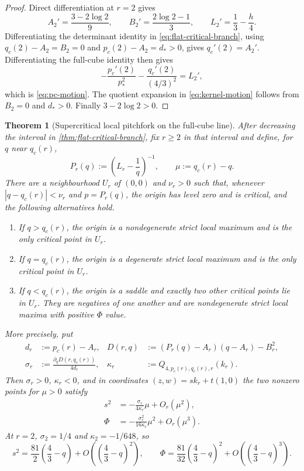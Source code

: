 \documentclass[11pt,reqno]{amsart}
\numberwithin{equation}{section}
\newtheorem{theorem}{Theorem}[section]
\theoremstyle{definition}
\theoremstyle{remark}
\begin{document}
\begin{proof}
Direct differentiation at $r=2$ gives
\[
  A_2'=\frac{3-2\log2}{9},
  \qquad
  B_2'=\frac{2\log2-1}{3},
  \qquad
  L_2'=\frac13-\frac h4.
\]
Differentiating the determinant identity in
\eqref{eq:flat-critical-branch}, using $q_c(2)-A_2=B_2=0$ and
$p_c(2)-A_2=d_*>0$, gives $q_c'(2)=A_2'$.  Differentiating the full-cube
identity then gives
\[
  -\frac{p_c'(2)}{p_*^2}
  -\frac{q_c'(2)}{(4/3)^2}
  =L_2',
\]
which is \eqref{eq:pc-motion}.  The quotient expansion in
\eqref{eq:kernel-motion} follows from $B_2=0$ and $d_*>0$.  Finally
$3-2\log2>0$.
\end{proof}

\begin{theorem}[Supercritical local pitchfork on the full-cube line]
\label{thm:flat-local-pitchfork}
After decreasing the interval in \cref{thm:flat-critical-branch}, fix
$r\ge2$ in that interval and define, for $q$ near $q_c(r)$,
\[
  P_r(q):=\left(L_r-\frac1q\right)^{-1},
  \qquad
  \mu:=q_c(r)-q.
\]
There are a neighbourhood $U_r$ of $(0,0)$ and $\nu_r>0$ such that, whenever
$|q-q_c(r)|<\nu_r$ and $p=P_r(q)$, the origin has level zero and is critical,
and the following alternatives hold.
\begin{enumerate}[label=\textup{(\roman*)}]
  \item If $q>q_c(r)$, the origin is a nondegenerate strict local maximum and
  is the only critical point in $U_r$.
  \item If $q=q_c(r)$, the origin is a degenerate strict local maximum and is
  the only critical point in $U_r$.
  \item If $q<q_c(r)$, the origin is a saddle and exactly two other critical
  points lie in $U_r$.  They are negatives of one another and are
  nondegenerate strict local maxima with positive $\Phi$ value.
\end{enumerate}
More precisely, put
\begin{align*}
  d_r&:=p_c(r)-A_r,
  &
  D(r,q)&:=(P_r(q)-A_r)(q-A_r)-B_r^2,\\
  \sigma_r&:=\frac{\partial_qD(r,q_c(r))}{4d_r},
  &
  \kappa_r&:=Q_{4,p_c(r),q_c(r),r}(k_r).
\end{align*}
Then $\sigma_r>0$, $\kappa_r<0$, and in coordinates
$(z,w)=sk_r+t(1,0)$ the two nonzero points for $\mu>0$ satisfy
\begin{align}
  s^2
  &=-\frac{\sigma_r}{4\kappa_r}\mu+O_r(\mu^2),
  \label{eq:pitchfork-amplitude}\\
  \Phi
  &=-\frac{\sigma_r^2}{16\kappa_r}\mu^2+O_r(\mu^3).
  \label{eq:pitchfork-gain}
\end{align}
At $r=2$, $\sigma_2=1/4$ and $\kappa_2=-1/648$, so
\[
  s^2=\frac{81}{2}\left(\frac43-q\right)
  +O\left(\left(\frac43-q\right)^2\right),
  \qquad
  \Phi=\frac{81}{32}\left(\frac43-q\right)^2
  +O\left(\left(\frac43-q\right)^3\right).
\]
\end{theorem}
\end{document}
